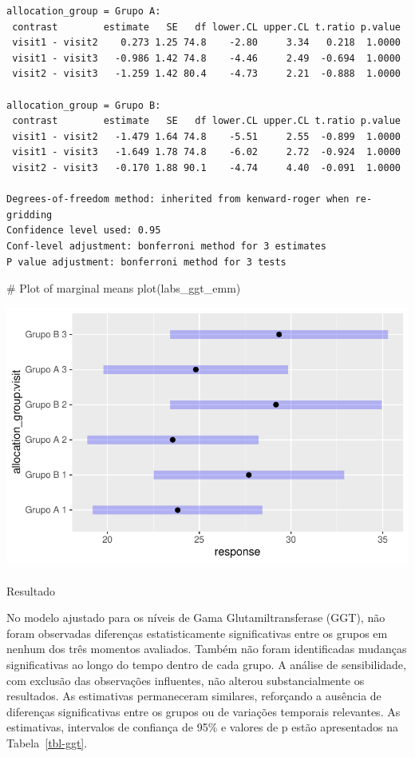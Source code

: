 \documentclass[
  12pt,
]{article}
\makeatletter
\let\oldparagraph\paragraph
\renewcommand{\paragraph}{
    \@ifstar
      \xxxParagraphStar
      \xxxParagraphNoStar
  }
\newcommand{\xxxParagraphStar}[1]{\oldparagraph*{#1}\mbox{}}
\newcommand{\xxxParagraphNoStar}[1]{\oldparagraph{#1}\mbox{}}
\newenvironment{Shaded}{\begin{snugshade}}{\end{snugshade}}
\newcommand{\CommentTok}[1]{\textcolor[rgb]{0.37,0.37,0.37}{#1}}
\newcommand{\FunctionTok}[1]{\textcolor[rgb]{0.28,0.35,0.67}{#1}}
\newcommand{\NormalTok}[1]{\textcolor[rgb]{0.00,0.23,0.31}{#1}}
\makeatother
\begin{document}
\begin{verbatim}
allocation_group = Grupo A:
 contrast        estimate   SE   df lower.CL upper.CL t.ratio p.value
 visit1 - visit2    0.273 1.25 74.8    -2.80     3.34   0.218  1.0000
 visit1 - visit3   -0.986 1.42 74.8    -4.46     2.49  -0.694  1.0000
 visit2 - visit3   -1.259 1.42 80.4    -4.73     2.21  -0.888  1.0000

allocation_group = Grupo B:
 contrast        estimate   SE   df lower.CL upper.CL t.ratio p.value
 visit1 - visit2   -1.479 1.64 74.8    -5.51     2.55  -0.899  1.0000
 visit1 - visit3   -1.649 1.78 74.8    -6.02     2.72  -0.924  1.0000
 visit2 - visit3   -0.170 1.88 90.1    -4.74     4.40  -0.091  1.0000

Degrees-of-freedom method: inherited from kenward-roger when re-gridding 
Confidence level used: 0.95 
Conf-level adjustment: bonferroni method for 3 estimates 
P value adjustment: bonferroni method for 3 tests 
\end{verbatim}

\begin{Shaded}
\begin{Highlighting}[]
\CommentTok{\# Plot of marginal means}
\FunctionTok{plot}\NormalTok{(labs\_ggt\_emm)}
\end{Highlighting}
\end{Shaded}

\includegraphics{Outcomes_files/figure-pdf/labs_ggt_sens_emm-1.pdf}

\paragraph{Resultado}\label{resultado-2}

No modelo ajustado para os níveis de Gama Glutamiltransferase (GGT), não
foram observadas diferenças estatisticamente significativas entre os
grupos em nenhum dos três momentos avaliados. Também não foram
identificadas mudanças significativas ao longo do tempo dentro de cada
grupo. A análise de sensibilidade, com exclusão das observações
influentes, não alterou substancialmente os resultados. As estimativas
permaneceram similares, reforçando a ausência de diferenças
significativas entre os grupos ou de variações temporais relevantes. As
estimativas, intervalos de confiança de 95\% e valores de p estão
apresentados na Tabela~\ref{tbl-ggt}.
\end{document}
